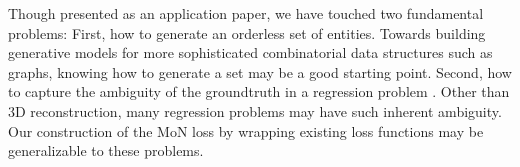 Though presented as an application paper, we have touched two fundamental problems: First, how to generate an orderless set of entities. Towards building generative models for more sophisticated combinatorial data structures such as graphs, knowing how to generate a set may be a good starting point. Second, how to capture the ambiguity of the groundtruth in a regression problem . Other than 3D reconstruction, many regression problems may have such inherent ambiguity. Our construction of the MoN loss by wrapping existing loss functions may be generalizable to these problems.

